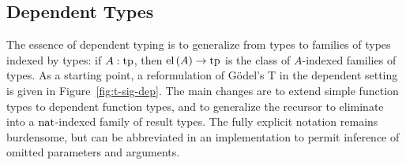 \documentclass[11pt,twoside]{article}
\newcommand{\const}[1]{\text{#1}}
\newcommand{\arrclass}[2]{{#1}\to{#2}}
\newcommand{\appobj}[2]{{#1}\,{#2}}
\begin{document}
\subsection{Dependent Types}

The essence of dependent typing is to generalize from types to families of types indexed
by types: if $A:\tpsort$, then $\arrclass{\elofp{A}}{\tpsort}$ is the class of $A$-indexed
families of types.  As a starting point, a reformulation of G\"odel's T in the dependent
setting is given in Figure~\ref{fig:t-sig-dep}.  The main changes are to extend simple
function types to dependent function types, and to generalize the recursor to eliminate
into a $\nattp$-indexed family of result types.  The fully explicit notation remains
burdensome, but can be abbreviated in an implementation to permit inference of omitted
parameters and arguments.

\newcommand{\pitp}{\const{pi}}
\newcommand{\piof}[2]{\appobj{\appobj{\pitp}{#1}}{#2}}
\end{document}
